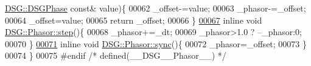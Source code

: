 \begin{DoxyCode}
      \hyperlink{namespace_d_s_g_a44431ce1eb0a7300efdd207bc879e52c}{DSG::DSGPhase} \textcolor{keyword}{const}& value)\{
00062         \_offset-=value;
00063         \_phasor-=\_offset;
00064         \_offset=value;
00065         \textcolor{keywordflow}{return} \_offset;
00066     \}
\hypertarget{_phasor_8h_source_l00067}{}\hyperlink{class_d_s_g_1_1_phasor_a6a088b29e506fb5e99d73f4f0160c583}{00067}     \textcolor{keyword}{inline} \textcolor{keywordtype}{void} \hyperlink{class_d_s_g_1_1_phasor_a6a088b29e506fb5e99d73f4f0160c583}{DSG::Phasor::step}()\{
00068         \_phasor+=\_dt;
00069         \_phasor>1.0 ? --\_phasor:0;
00070     \}
\hypertarget{_phasor_8h_source_l00071}{}\hyperlink{class_d_s_g_1_1_phasor_a3e9022f8264d4b2ffc485ef725d331e8}{00071}     \textcolor{keyword}{inline} \textcolor{keywordtype}{void} \hyperlink{class_d_s_g_1_1_phasor_a3e9022f8264d4b2ffc485ef725d331e8}{DSG::Phasor::sync}()\{
00072         \_phasor=\_offset;
00073     \}
00074 \}
00075 \textcolor{preprocessor}{#endif }\textcolor{comment}{/* defined(\_\_DSG\_\_Phasor\_\_) */}\textcolor{preprocessor}{}
\end{DoxyCode}
